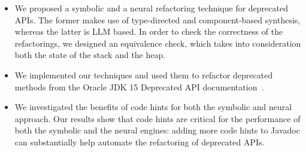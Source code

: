 \documentclass[sigconf,review,anonymous]{acmart}
\begin{document}
\begin{itemize}

\item We proposed a symbolic and a neural refactoring technique for deprecated APIs. The former makes use of type-directed and component-based synthesis, whereas the latter is LLM based. In order to check the correctness of the refactorings, we designed an equivalence check, which takes into consideration both the state of the stack and the heap.


\item We implemented our techniques and used them to refactor deprecated methods from the Oracle
JDK 15 Deprecated API documentation~\cite{OracleJdk15DeprecatedAPI}.

\item We investigated the benefits of code hints for both the symbolic and neural approach. %
  Our results show that code hints are critical for the performance of both the symbolic and the neural engines: adding more code hints to Javadoc
can substantially help automate the refactoring of deprecated APIs.


\end{itemize}  
\end{document}
